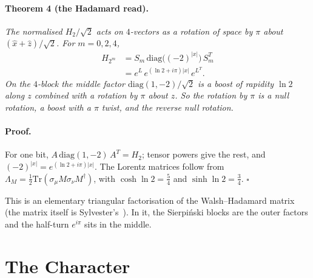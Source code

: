 \documentclass[twocolumn]{iopjournal}
\begin{document}
\paragraph{Theorem 4 (the Hadamard read).} \textit{The normalised
$H_2/\sqrt2$ acts on $4$-vectors as a rotation of space by $\pi$ about
$(\hat x + \hat z)/\sqrt2$. For $m = 0, 2, 4$,}
\begin{equation}
\begin{aligned}
  H_{2^m} &= S_m\,\mathrm{diag}\big((-2)^{|x|}\big)\,S_m^{T}\\
  &= e^{L}\,e^{(\ln 2 + i\pi)|x|}\,e^{L^T}.
\end{aligned}
\end{equation}
\textit{On the $4$-block the middle factor
$\mathrm{diag}(1,-2)/\sqrt2$ is a boost of rapidity $\ln 2$ along $z$
combined with a rotation by $\pi$ about $z$. So the rotation by $\pi$
is a null rotation, a boost with a $\pi$ twist, and the reverse null
rotation.}

\paragraph{Proof.} For one bit,
$A\,\mathrm{diag}(1,-2)\,A^T = H_2$; tensor powers give the rest, and
$(-2)^{|x|} = e^{(\ln 2 + i\pi)|x|}$. The Lorentz matrices follow
from $\Lambda_M = \tfrac12\mathrm{Tr}(\sigma_\mu M \sigma_\nu
M^\dagger)$, with $\cosh\ln2 = \tfrac54$ and $\sinh\ln2 = \tfrac34$.
\hfill $\square$

\medskip
\noindent
This is an elementary triangular factorisation of the Walsh--Hadamard
matrix (the matrix itself is Sylvester's~\cite{Sylvester1867}). In it,
the Sierpi\'nski blocks are the outer factors and the half-turn
$e^{i\pi}$ sits in the middle.


\section*{The Character}
\end{document}
